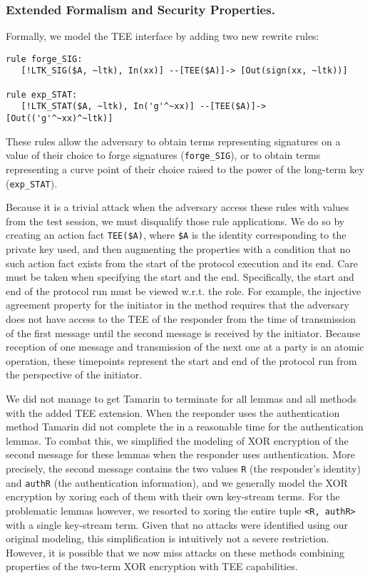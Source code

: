 \subsubsection{Extended Formalism and Security Properties.}
\label{sec:TEE:fmAndProps}
Formally, we model the TEE interface by adding two new rewrite rules:
%
\begin{small}
\begin{verbatim}
rule forge_SIG:
   [!LTK_SIG($A, ~ltk), In(xx)] --[TEE($A)]-> [Out(sign(xx, ~ltk))]

rule exp_STAT:
   [!LTK_STAT($A, ~ltk), In('g'^~xx)] --[TEE($A)]-> [Out(('g'^~xx)^~ltk)]
\end{verbatim}
\end{small}
%
These rules allow the adversary to obtain terms representing signatures on a
value of their choice to forge signatures (\verb|forge_SIG|), or to obtain terms
representing a curve point of their choice raised to the power of the
long-term key (\verb|exp_STAT|).
%

Because it is a trivial attack when the adversary access these rules with values
from the test session, we must disqualify those rule applications.
%
We do so by creating an action fact \verb|TEE($A)|, where \verb|$A| is the
identity corresponding to the private key used, and then augmenting the
properties with a condition that no such action fact exists from the start of
the protocol execution and its end.
%
Care must be taken when specifying the start and the end.
%
Specifically, the start and end of the protocol run must be viewed w.r.t. the
role.
%
For example, the injective agreement property for the initiator in
the \mSigSig{} method requires that the adversary does not have access to the
TEE of the
responder from the time of transmission of the first message until the second
message is received by the initiator.
%
Because reception of one message and transmission of the next one at a party
is an atomic operation, these timepoints represent the start and end of the
protocol run from the perspective of the initiator.
%

We did not manage to get Tamarin to terminate for all lemmas and all 
methods
with the added TEE extension.
%
When the responder uses the \mStat{} authentication method Tamarin did not
complete the in a reasonable time for the authentication lemmas.
%
To combat this, we simplified the modeling of XOR encryption of the second
message for these lemmas when the responder uses \mStat{} authentication.
%
More precisely, the second message contains the two values \verb|R| (the
responder's identity) and
\verb|authR| (the authentication information), and we generally model the
XOR encryption by xoring each of them with their own key-stream terms.
%
For the problematic lemmas however, we resorted to xoring the entire tuple
\verb|<R, authR>| with a single key-stream term.
%
Given that no attacks were identified using our original modeling, this
simplification is intuitively not a severe restriction.
%
However, it is possible that we now miss attacks on these methods
combining properties of the two-term XOR encryption with TEE capabilities.
%

